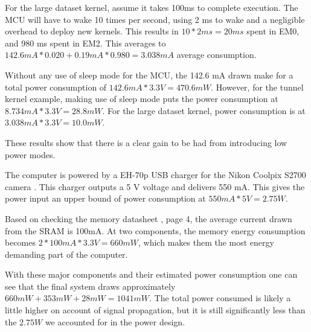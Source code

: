 \documentclass[../main/report.tex]{subfiles}
\begin{document}
For the large dataset kernel, assume it takes 100ms to complete execution.
The MCU will have to wake 10 times per second, using 2 ms to wake and a negligible overhead to deploy new kernels.
This results in $ 10 * 2 ms = 20 ms $ spent in EM0, and 980 ms spent in EM2.
This averages to $ 142.6 mA * 0.020 + 0.19 mA * 0.980 = 3.038 mA $ average consumption.

Without any use of sleep mode for the MCU, the 142.6 mA drawn make for a total power consumption of $142.6 mA * 3.3V = 470.6 mW $.
However, for the tunnel kernel example, making use of sleep mode puts the power consumption at $ 8.734 mA * 3.3V = 28.8mW$. 
For the large dataset kernel, power consumption is at $ 3.038 mA * 3.3V = 10.0 mW$.

These results show that there is a clear gain to be had from introducing low power modes. 


The computer is powered by a EH-70p USB charger for the Nikon Coolpix S2700 camera \cite[p. 196]{usb-charger}.
This charger outputs a 5 V voltage and delivers 550 mA.
This gives the power input an upper bound of power consumption at $550mA * 5V = 2.75W$.

Based on checking the memory datasheet \cite{SRAM-datasheet}, page 4, the average current drawn from the SRAM is 100mA.
At two components, the memory energy consumption becomes $2 * 100mA * 3.3V = 660mW$, which makes them the most energy demanding part of the computer. 

With these major components and their estimated power consumption one can see that the final system draws approximately $ 660mW + 353mW + 28mW = 1041mW $. The total power consumed is likely a little higher on account of signal propagation, but it is still significantly less than the $2.75 W$ we accounted for in the power design.
\end{document}
